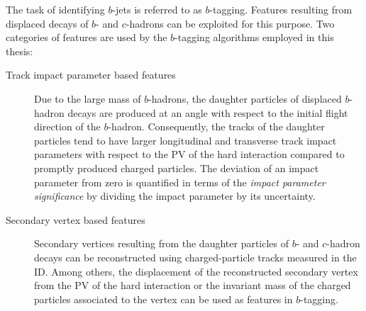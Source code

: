 The task of identifying $b$-jets is referred to as $b$-tagging. Features
resulting from displaced decays of $b$- and $c$-hadrons can be exploited for
this purpose. Two categories of features are used by the $b$-tagging algorithms
employed in this thesis:
\begin{description}

\item[Track impact parameter based features] Due to the large mass of
  $b$-hadrons, the daughter particles of displaced $b$-hadron decays are
  produced at an angle with respect to the initial flight direction of the
  $b$-hadron. Consequently, the tracks of the daughter particles tend to have
  larger longitudinal and transverse track impact parameters with respect to the
  PV of the hard interaction compared to promptly produced charged
  particles. The deviation of an impact parameter from zero is quantified in
  terms of the \emph{impact parameter significance} by dividing the impact
  parameter by its uncertainty.

\item[Secondary vertex based features] Secondary vertices resulting from the
  daughter particles of $b$- and $c$-hadron decays can be reconstructed using
  charged-particle tracks measured in the ID. Among others, the displacement of
  the reconstructed secondary vertex from the PV of the hard interaction or the
  invariant mass of the charged particles associated to the vertex can be used
  as features in $b$-tagging.
\end{description}

